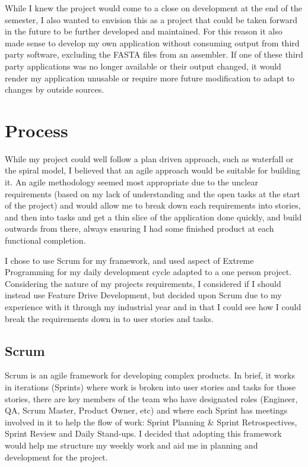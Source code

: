 While I knew the project would come to a close on development at the end of the semester, I also wanted to envision this as a project that could be taken forward in the future to be further developed and maintained. For this reason it also made sense to develop my own application without consuming output from third party software, excluding the FASTA files from an assembler. If one of these third party applications was no longer available or their output changed, it would render my application unusable or require more future modification to adapt to changes by outside sources.


\section{Process}
While my project could well follow a plan driven approach, such as waterfall or the spiral model, I believed that an agile approach would be suitable for building it. An agile methodology seemed most appropriate due to the unclear requirements (based on my lack of understanding and the open tasks at the start of the project) and would allow me to break down each requirements into stories, and then into tasks and get a thin slice of the application done quickly, and build outwards from there, always ensuring I had some finished product at each functional completion.

I chose to use Scrum for my framework, and used aspect of Extreme Programming for my daily development cycle adapted to a one person project. Considering the  nature of my projects requirements, I considered if I should instead use Feature Drive Development, but decided upon Scrum due to my experience with it through my industrial year and in that I could see how I could break the requirements down in to user stories and tasks.

\subsection{Scrum}
Scrum is an agile framework for developing complex products\cite{Schw01a}. In brief, it works in iterations (Sprints) where work is broken into user stories and tasks for those stories, there are key members of the team who have designated roles (Engineer, QA, Scrum Master, Product Owner, etc) and where each Sprint has meetings involved in it to help the flow of work: Sprint Planning \& Sprint Retrospectives, Sprint Review and Daily Stand-ups. I decided that adopting this framework would help me structure my weekly work and aid me in planning and development for the project.

